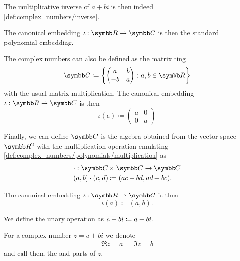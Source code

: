 \begin{definition}
\begin{defenum}
    The multiplicative inverse of \( a + bi \) is then indeed \cref{def:complex_numbers/inverse}.

    The canonical embedding \( \iota: \R \to \C \) is then the standard polynomial embedding.

     The complex numbers can also be defined as the matrix ring
    \begin{equation*}
      \C \coloneqq \left\{
        \begin{pmatrix}
          a & b \\
          -b & a
        \end{pmatrix}
      \colon a, b \in \R \right\}
    \end{equation*}
    with the usual matrix multiplication. The canonical embedding \( \iota: \R \to \C \) is then
    \begin{equation*}
      \iota(a) \coloneqq \begin{pmatrix}
        a & 0 \\
        0 & a
      \end{pmatrix}
    \end{equation*}

     Finally, we can define \( \C \) is the algebra obtained from the vector space \( \R^2 \) with the multiplication operation emulating \cref{def:complex_numbers/polynomials/multiplication} as
    \begin{align*}
      &\cdot: \C \times \C \to \C \\
      &(a, b) \cdot (c, d) \coloneqq (ac - bd, ad + bc).
    \end{align*}

    The canonical embedding \( \iota: \R \to \C \) is then
    \begin{equation*}
      \iota(a) \coloneqq (a, b).
    \end{equation*}
  \end{defenum}

  We define the unary  operation as \( \overline{a + bi} \coloneqq a - bi \).

  For a complex number \( z = a + bi \) we denote
  \begin{align*}
    \Re z = a && \Im z = b
  \end{align*}
  and call them the  and  parts of \( z \).
\end{definition}

